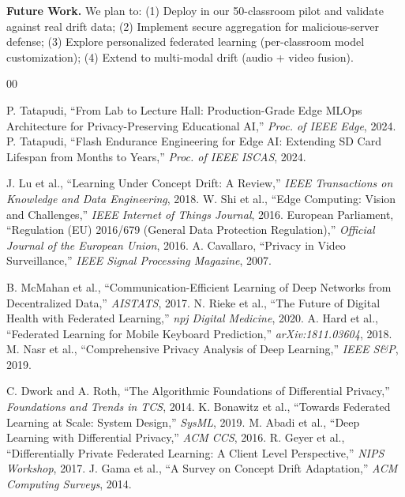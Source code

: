 \documentclass[conference]{IEEEtran}
\begin{document}
\textbf{Future Work.} We plan to: (1) Deploy in our 50-classroom pilot and validate against real drift data; (2) Implement secure aggregation for malicious-server defense; (3) Explore personalized federated learning (per-classroom model customization); (4) Extend to multi-modal drift (audio + video fusion).

\begin{thebibliography}{00}

 P. Tatapudi, ``From Lab to Lecture Hall: Production-Grade Edge MLOps Architecture for Privacy-Preserving Educational AI,'' \textit{Proc. of IEEE Edge}, 2024.
 P. Tatapudi, ``Flash Endurance Engineering for Edge AI: Extending SD Card Lifespan from Months to Years,'' \textit{Proc. of IEEE ISCAS}, 2024.

 J. Lu et al., ``Learning Under Concept Drift: A Review,'' \textit{IEEE Transactions on Knowledge and Data Engineering}, 2018.
 W. Shi et al., ``Edge Computing: Vision and Challenges,'' \textit{IEEE Internet of Things Journal}, 2016.
 European Parliament, ``Regulation (EU) 2016/679 (General Data Protection Regulation),'' \textit{Official Journal of the European Union}, 2016.
 A. Cavallaro, ``Privacy in Video Surveillance,'' \textit{IEEE Signal Processing Magazine}, 2007.

 B. McMahan et al., ``Communication-Efficient Learning of Deep Networks from Decentralized Data,'' \textit{AISTATS}, 2017.
 N. Rieke et al., ``The Future of Digital Health with Federated Learning,'' \textit{npj Digital Medicine}, 2020.
 A. Hard et al., ``Federated Learning for Mobile Keyboard Prediction,'' \textit{arXiv:1811.03604}, 2018.
 M. Nasr et al., ``Comprehensive Privacy Analysis of Deep Learning,'' \textit{IEEE S\&P}, 2019.

 C. Dwork and A. Roth, ``The Algorithmic Foundations of Differential Privacy,'' \textit{Foundations and Trends in TCS}, 2014.
 K. Bonawitz et al., ``Towards Federated Learning at Scale: System Design,'' \textit{SysML}, 2019.
 M. Abadi et al., ``Deep Learning with Differential Privacy,'' \textit{ACM CCS}, 2016.
 R. Geyer et al., ``Differentially Private Federated Learning: A Client Level Perspective,'' \textit{NIPS Workshop}, 2017.
 J. Gama et al., ``A Survey on Concept Drift Adaptation,'' \textit{ACM Computing Surveys}, 2014.


\end{thebibliography}
\end{document}
